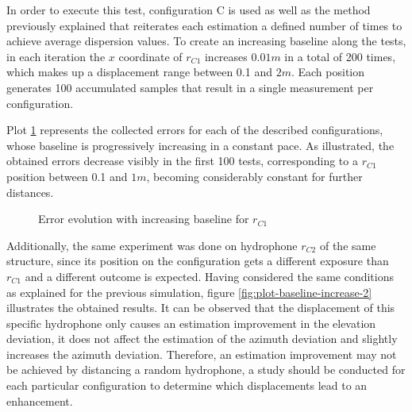 In order to execute this test, configuration C is used as well as the method previously explained that reiterates each estimation a defined number of times to achieve average dispersion values. To create an increasing baseline along the tests, in each iteration the $x$ coordinate of $r_{C1}$ increases $0.01 m$ in a total of 200 times, which makes up a displacement range between 0.1 and $2 m$. Each position generates 100 accumulated samples that result in a single measurement per configuration. 

Plot \ref{fig:plot-baseline-increase-1} represents the collected errors for each of the described configurations, whose baseline is progressively increasing in a constant pace. As illustrated, the obtained errors decrease visibly in the first 100 tests, corresponding to a $r_{C1}$ position between 0.1 and $1 m$, becoming considerably constant for further distances.

\begin{figure}[!htbp]
	\captionsetup{justification=centering,margin=2cm}
	\caption{Error evolution with increasing baseline for $r_{C1}$}
	\label{fig:plot-baseline-increase-1}
\end{figure}

Additionally, the same experiment was done on hydrophone $r_{C2}$ of the same structure, since its position on the configuration gets a different exposure than $r_{C1}$ and a different outcome is expected. Having considered the same conditions as explained for the previous simulation, figure \ref{fig:plot-baseline-increase-2} illustrates the obtained results. It can be observed that the displacement of this specific hydrophone only causes an estimation improvement in the elevation deviation, it does not affect the estimation of the azimuth deviation and slightly increases the azimuth deviation. Therefore, an estimation improvement may not be achieved by distancing a random hydrophone, a study should be conducted for each particular configuration to determine which displacements lead to an enhancement.

